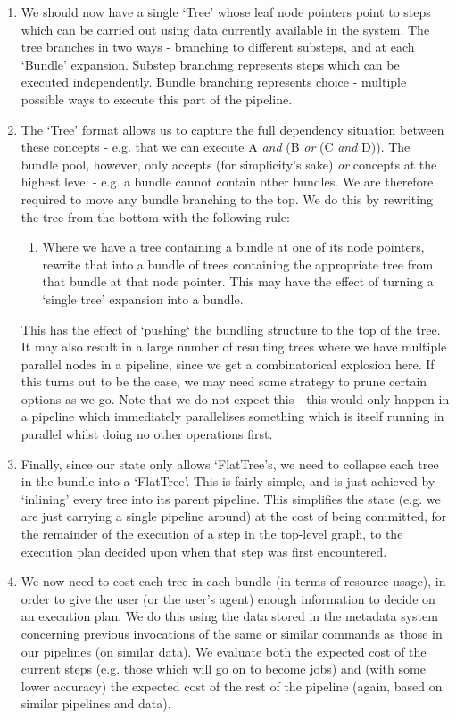 \documentclass[10pt,a4paper]{article}
\begin{document}
\begin{appendices}
\begin{enumerate}
\item We should now have a single `Tree' whose leaf node pointers point to steps which can be carried out using data currently available in the system. The tree branches in two ways - branching to different substeps, and at each `Bundle' expansion. Substep branching represents steps which can be executed independently. Bundle branching represents choice - multiple possible ways to execute this part of the pipeline.
\item The `Tree' format allows us to capture the full dependency situation between these concepts - e.g. that we can execute A \textit{and} (B \textit{or} (C \textit{and} D)). The bundle pool, however, only accepts (for simplicity's sake) \textit{or} concepts at the highest level - e.g. a bundle cannot contain other bundles. We are therefore required to move any bundle branching to the top. We do this by rewriting the tree from the bottom with the following rule:
\begin{enumerate}
\item Where we have a tree containing a bundle at one of its node pointers, rewrite that into a bundle of trees containing the appropriate tree from that bundle at that node pointer. This may have the effect of turning a `single tree' expansion into a bundle.
\end{enumerate}
This has the effect of `pushing` the bundling structure to the top of the tree. It may also result in a large number of resulting trees where we have multiple parallel nodes in a pipeline, since we get a combinatorical explosion here. If this turns out to be the case, we may need some strategy to prune certain options as we go. Note that we do not expect this - this would only happen in a pipeline which immediately parallelises something which is itself running in parallel whilst doing no other operations first.
\item Finally, since our state only allows `FlatTree's, we need to collapse each tree in the bundle into a `FlatTree'. This is fairly simple, and is just achieved by `inlining' every tree into its parent pipeline. This simplifies the state (e.g. we are just carrying a single pipeline around) at the cost of being committed, for the remainder of the execution of a step in the top-level graph, to the execution plan decided upon when that step was first encountered.
\item We now need to cost each tree in each bundle (in terms of resource usage), in order to give the user (or the user's agent) enough information to decide on an execution plan. We do this using the data stored in the metadata system concerning previous invocations of the same or similar commands as those in our pipelines (on similar data). We evaluate both the expected cost of the current steps (e.g. those which will go on to become jobs) and (with some lower accuracy) the expected cost of the rest of the pipeline (again, based on similar pipelines and data).
\end{enumerate}


\end{appendices}
\end{document}
